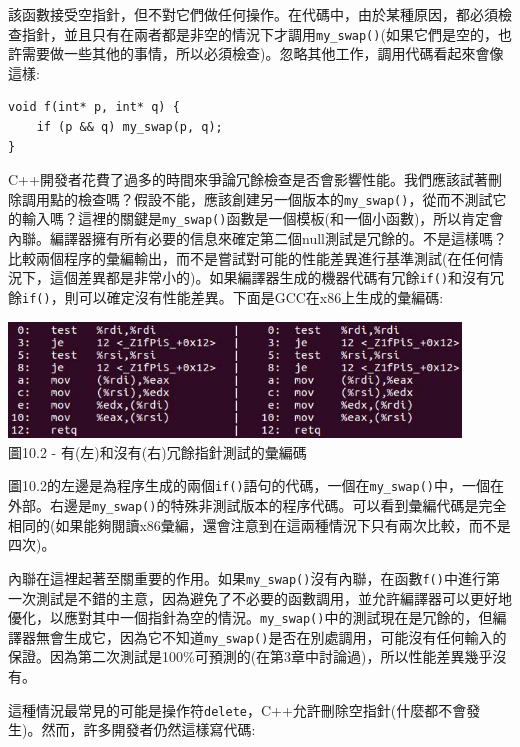 該函數接受空指針，但不對它們做任何操作。在代碼中，由於某種原因，都必須檢查指針，並且只有在兩者都是非空的情況下才調用\texttt{my\_swap()}(如果它們是空的，也許需要做一些其他的事情，所以必須檢查)。忽略其他工作，調用代碼看起來會像這樣:

\begin{lstlisting}[style=styleCXX]
void f(int* p, int* q) {
	if (p && q) my_swap(p, q);
}
\end{lstlisting}

C++開發者花費了過多的時間來爭論冗餘檢查是否會影響性能。我們應該試著刪除調用點的檢查嗎？假設不能，應該創建另一個版本的\texttt{my\_swap()}，從而不測試它的輸入嗎？這裡的關鍵是\texttt{my\_swap()}函數是一個模板(和一個小函數)，所以肯定會內聯。編譯器擁有所有必要的信息來確定第二個null測試是冗餘的。不是這樣嗎？比較兩個程序的彙編輸出，而不是嘗試對可能的性能差異進行基準測試(在任何情況下，這個差異都是非常小的)。如果編譯器生成的機器代碼有冗餘\texttt{if()}和沒有冗餘\texttt{if()}，則可以確定沒有性能差異。下面是GCC在x86上生成的彙編碼:

\begin{center}
\includegraphics[width=0.9\textwidth]{content/3/chapter10/images/2.jpg}\\
圖10.2 - 有(左)和沒有(右)冗餘指針測試的彙編碼
\end{center}

圖10.2的左邊是為程序生成的兩個\texttt{if()}語句的代碼，一個在\texttt{my\_swap()}中，一個在外部。右邊是\texttt{my\_swap()}的特殊非測試版本的程序代碼。可以看到彙編代碼是完全相同的(如果能夠閱讀x86彙編，還會注意到在這兩種情況下只有兩次比較，而不是四次)。 

內聯在這裡起著至關重要的作用。如果\texttt{my\_swap()}沒有內聯，在函數\texttt{f()}中進行第一次測試是不錯的主意，因為避免了不必要的函數調用，並允許編譯器可以更好地優化，以應對其中一個指針為空的情況。\texttt{my\_swap()}中的測試現在是冗餘的，但編譯器無會生成它，因為它不知道\texttt{my\_swap()}是否在別處調用，可能沒有任何輸入的保證。因為第二次測試是100\%可預測的(在第3章中討論過)，所以性能差異幾乎沒有。

這種情況最常見的可能是操作符\texttt{delete}，C++允許刪除空指針(什麼都不會發生)。然而，許多開發者仍然這樣寫代碼:

